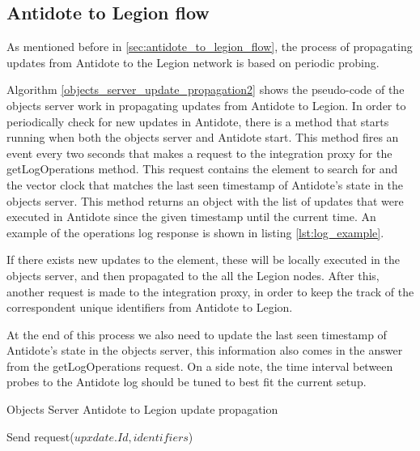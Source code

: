 \subsection{Antidote to Legion flow}
\label{sec:legion_changes_antidote to legion flow}
As mentioned before in \ref{sec:antidote_to_legion_flow}, the process of propagating updates from Antidote to the Legion network is based on periodic probing.\par
	Algorithm \ref{objects_server_update_propagation2} shows the pseudo-code of the objects server work in propagating updates from Antidote to Legion. In order to periodically check for new updates in Antidote, there is a method that starts running when both the objects server and Antidote start. This method fires an event every two seconds that makes a request to the integration proxy for the getLogOperations method. This request contains the element to search for and the vector clock that matches the last seen timestamp of Antidote's state in the objects server. This method returns an object with the list of updates that were executed in Antidote since the given timestamp until the current time. An example of  the operations log response is shown in listing \ref{lst:log_example}.\par
	If there exists new updates to the element, these will be locally executed in the objects server, and then propagated to the all the Legion nodes. After this, another request is made to the integration proxy, in order to keep the track of the correspondent unique identifiers from Antidote to Legion.\par
	At the end of this process we also need to update the last seen timestamp of Antidote's state in the objects server, this information also comes in the answer from the getLogOperations request. On a side note, the time interval between probes to the Antidote log should be tuned to best fit the current setup.
	
\begin{algorithm}[H]
\caption{Objects Server Antidote to Legion update propagation}\label{objects_server_update_propagation2}
\begin{algorithmic}[1]
        \State Send request($upxdate.Id, identifiers$)
      \EndFor
\End
\end{algorithmic}
\end{algorithm}
	
